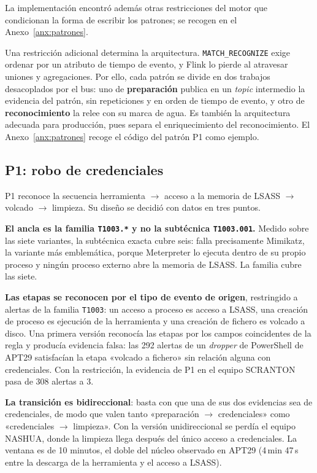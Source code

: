 La implementación encontró además otras restricciones del motor que condicionan la forma de
escribir los patrones; se recogen en el Anexo~\ref{anx:patrones}.

Una restricción adicional determina la arquitectura. \texttt{MATCH\_RECOGNIZE} exige ordenar
por un atributo de tiempo de evento, y Flink lo pierde al atravesar uniones y agregaciones.
Por ello, cada patrón se divide en dos trabajos desacoplados por el bus: uno de
\textbf{preparación} publica en un \textit{topic} intermedio la evidencia del patrón, sin
repeticiones y en orden de tiempo de evento, y otro de \textbf{reconocimiento} la relee con
su marca de agua. Es también la arquitectura adecuada para producción, pues separa el
enriquecimiento del reconocimiento. El Anexo~\ref{anx:patrones} recoge el código del
patrón P1 como ejemplo.

\subsection{P1: robo de credenciales}

P1 reconoce la secuencia herramienta $\rightarrow$ acceso a la memoria de LSASS
$\rightarrow$ volcado $\rightarrow$ limpieza. Su diseño se decidió con datos en tres puntos.

\textbf{El ancla es la familia \texttt{T1003.*} y no la subtécnica \texttt{T1003.001}.}
Medido sobre las siete variantes, la subtécnica exacta cubre seis: falla precisamente
Mimikatz, la variante más emblemática, porque Meterpreter lo ejecuta dentro de su propio
proceso y ningún proceso externo abre la memoria de LSASS. La familia cubre las siete.

\textbf{Las etapas se reconocen por el tipo de evento de origen}, restringido a alertas de
la familia \texttt{T1003}: un acceso a proceso es acceso a LSASS, una creación de proceso es
ejecución de la herramienta y una creación de fichero es volcado a disco. Una primera versión
reconocía las etapas por los campos coincidentes de la regla y producía evidencia falsa: las
292 alertas de un \textit{dropper} de PowerShell de APT29 satisfacían la etapa «volcado a
fichero» sin relación alguna con credenciales. Con la restricción, la evidencia de P1 en el
equipo SCRANTON pasa de 308 alertas a 3.

\textbf{La transición es bidireccional}: basta con que una de sus dos evidencias sea de
credenciales, de modo que valen tanto «preparación $\rightarrow$ credenciales» como
«credenciales $\rightarrow$ limpieza». Con la versión unidireccional se perdía el equipo
NASHUA, donde la limpieza llega después del único acceso a credenciales. La ventana es de
10 minutos, el doble del núcleo observado en APT29 (4\,min 47\,s entre la descarga de la
herramienta y el acceso a LSASS).

